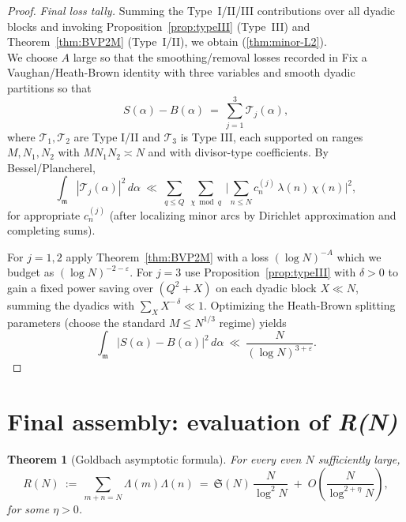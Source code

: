 \documentclass[11pt]{article}
\def\eqref#1{(\ref{#1})}%
\newtheorem{theorem}[lemma]{Theorem}
\theoremstyle{definition}
\theoremstyle{remark}
\numberwithin{equation}{part}
\begin{document}
\begin{proof}
	\emph{Final loss tally.}
	Summing the Type~I/II/III contributions over all dyadic blocks and invoking Proposition~\ref{prop:typeIII} (Type~III) and Theorem~\ref{thm:BVP2M} (Type~I/II), we obtain \eqref{thm:minor-L2}. \\

	We choose $A$ large so that the smoothing/removal losses recorded in
	Fix a Vaughan/Heath-Brown identity with three variables and smooth dyadic partitions so that
	\[
		S(\alpha)-B(\alpha)\ =\ \sum_{j=1}^3 \mathcal T_j(\alpha),
	\]
	where $\mathcal T_1,\mathcal T_2$ are Type I/II and $\mathcal T_3$ is Type III, each supported on ranges $M,N_1,N_2$ with $MN_1N_2\asymp N$ and with divisor-type coefficients. By Bessel/Plancherel,
	\[
		\int_{\mathfrak m} |\mathcal T_j(\alpha)|^2\,d\alpha \ \ll\ \sum_{q\le Q}\ \sum_{\chi\bmod q}\ \Big|\sum_{n\le N} c^{(j)}_n\,\lambda(n)\,\chi(n)\Big|^2,
	\]
	for appropriate $c^{(j)}_n$ (after localizing minor arcs by Dirichlet approximation and completing sums).

	For $j=1,2$ apply Theorem~\ref{thm:BVP2M} with a loss $(\log N)^{-A}$ which we budget as $(\log N)^{-2-\varepsilon}$. For $j=3$ use Proposition~\ref{prop:typeIII} with $\delta>0$ to gain a fixed power saving over $(Q^2+X)$ on each dyadic block $X\ll N$, summing the dyadics with $\sum_X X^{-\,\delta}\ll 1$. Optimizing the Heath-Brown splitting parameters (choose the standard $M\le N^{1/3}$ regime) yields
	\[
		\int_{\mathfrak m} \big|S(\alpha)-B(\alpha)\big|^2\,d\alpha \ \ll\ \frac{N}{(\log N)^{3+\varepsilon}}.
	\]
\end{proof}

\section{Final assembly: evaluation of \textit{R(N)}}

\begin{theorem}[Goldbach asymptotic formula]\label{thm:goldbach-asymptotic}
	For every even $N$ sufficiently large,
	\[
		R(N)\ :=\ \sum_{m+n=N} \Lambda(m)\Lambda(n)
		\ =\ \mathfrak S(N)\,\frac{N}{\log^2 N}
		\;+\; O\!\left(\frac{N}{\log^{2+\eta} N}\right),
	\]
	for some $\eta>0$.
\end{theorem}
\end{document}

